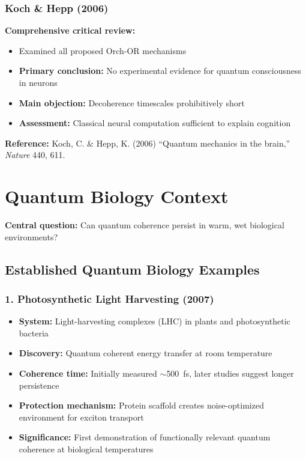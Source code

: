 \subsubsection{Koch \& Hepp (2006)}

\textbf{Comprehensive critical review:}
\begin{itemize}
\item Examined all proposed Orch-OR mechanisms
\item \textbf{Primary conclusion:} No experimental evidence for quantum consciousness in neurons
\item \textbf{Main objection:} Decoherence timescales prohibitively short
\item \textbf{Assessment:} Classical neural computation sufficient to explain cognition
\end{itemize}

\textbf{Reference:} Koch, C. \& Hepp, K. (2006) ``Quantum mechanics in the brain,'' \textit{Nature} 440, 611.

\section{Quantum Biology Context}

\textbf{Central question:} Can quantum coherence persist in warm, wet biological environments?

\subsection{Established Quantum Biology Examples}

\subsubsection{1. Photosynthetic Light Harvesting (2007)}

\begin{itemize}
\item \textbf{System:} Light-harvesting complexes (LHC) in plants and photosynthetic bacteria
\item \textbf{Discovery:} Quantum coherent energy transfer at room temperature
\item \textbf{Coherence time:} Initially measured $\sim$500~fs, later studies suggest longer persistence
\item \textbf{Protection mechanism:} Protein scaffold creates noise-optimized environment for exciton transport
\item \textbf{Significance:} First demonstration of functionally relevant quantum coherence at biological temperatures
\end{itemize}

